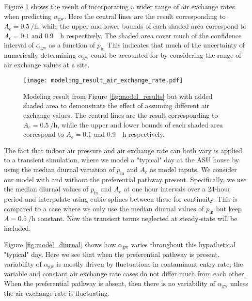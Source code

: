 Figure \ref{fig:model_results_air_exchange_rate} shows the result of incorporating a wider range of air exchange rates when predicting $\alpha_\mathrm{gw}$.
Here the central lines are the result corresponding to $A_e = \SI{0.5}{\per\hour}$, while the upper and lower bounds of each shaded area correspond to $A_e = 0.1$ and \SI{0.9}{\per\hour} respectively.
The shaded area cover much of the confidence interval of $\alpha_\mathrm{gw}$ as a function of $p_\mathrm{in}$
This indicates that much of the uncertainty of numerically determining $\alpha_\mathrm{gw}$ could be accounted for by considering the range of air exchange values at a site.\par

\begin{figure}[htb!]
  \centering
  \texttt{[image: modeling\_result\_air\_exchange\_rate.pdf]}
  \caption[Effect of different air exchange rate on predicted indoor contaminant concentration.]{Modeling result from Figure \ref{fig:model_results} but with added shaded area to demonstrate the effect of assuming different air exchange values. The central lines are the result corresponding to $A_e = \SI{0.5}{\per\hour}$, while the upper and lower bounds of each shaded area correspond to $A_e = 0.1$ and \SI{0.9}{\per\hour} respectively.}
  \label{fig:model_results_air_exchange_rate}
\end{figure}

The fact that indoor air pressure and air exchange rate can both vary is applied to a transient simulation, where we model a "typical" day at the ASU house by using the median diurnal variation of $p_\mathrm{in}$ and $A_e$ as model inputs.
We consider our model with and without the preferential pathway present.
Specifically, we use the median diurnal values of $p_\mathrm{in}$ and $A_e$ at one hour intervals over a 24-hour period and interpolate using cubic splines between these for continuity.
This is compared to a case where we only use the median diurnal values of $p_\mathrm{in}$ but keep $A = \SI{0.5}{\per\hour}$ constant.
Now the transient terms neglected at steady-state will be included.\par

Figure \ref{fig:model_diurnal} shows how $\alpha_\mathrm{gw}$ varies throughout this hypothetical "typical" day.
Here we see that when the preferential pathway is present, variability of $\alpha_\mathrm{gw}$ is mostly driven by fluctuations in contaminant entry rate; the variable and constant air exchange rate cases do not differ much from each other.
When the preferential pathway is absent, then there is no variability of $\alpha_\mathrm{gw}$ unless the air exchange rate is fluctuating.\par

